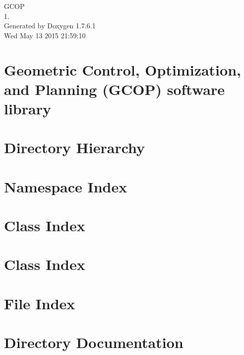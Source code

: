 \documentclass[a4paper]{book}
\begin{document}
\begin{titlepage}
\vspace*{7cm}
\begin{center}
{\Large \-G\-C\-O\-P \\[1ex]\large 1. }\\
\vspace*{1cm}
{\large \-Generated by Doxygen 1.7.6.1}\\
\vspace*{0.5cm}
{\small Wed May 13 2015 21:59:10}\\
\end{center}
\end{titlepage}
\clearemptydoublepage
{}
\tableofcontents
\clearemptydoublepage
{}
\chapter{\-Geometric \-Control, \-Optimization, and \-Planning (\-G\-C\-O\-P) software library}
\label{index}
\chapter{\-Directory \-Hierarchy}

\chapter{\-Namespace \-Index}

\chapter{\-Class \-Index}

\chapter{\-Class \-Index}

\chapter{\-File \-Index}

\chapter{\-Directory \-Documentation}













\end{document}
